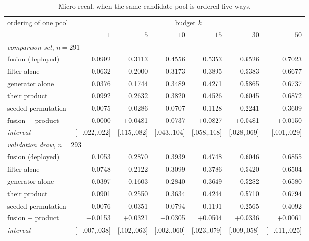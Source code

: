 \begin{table}[h]
\centering\small
\begin{threeparttable}
\caption{Micro recall when the same candidate pool is ordered five ways.}
\label{tab:si-ranking}
\begin{tabular}{lrrrrrr}
\toprule
ordering of one pool & \multicolumn{6}{c}{budget $k$} \\
\cmidrule(lr){2-7}
 & $1$ & $5$ & $10$ & $15$ & $30$ & $50$ \\
\midrule
\multicolumn{7}{l}{\emph{comparison set}, $n = 291$} \\
fusion (deployed) & 0.0992 & 0.3113 & 0.4556 & 0.5353 & 0.6526 & 0.7023 \\
filter alone & 0.0632 & 0.2000 & 0.3173 & 0.3895 & 0.5383 & 0.6677 \\
generator alone & 0.0376 & 0.1744 & 0.3489 & 0.4271 & 0.5865 & 0.6737 \\
their product & 0.0992 & 0.2632 & 0.3820 & 0.4526 & 0.6045 & 0.6872 \\
seeded permutation & 0.0075 & 0.0286 & 0.0707 & 0.1128 & 0.2241 & 0.3609 \\
\quad fusion $-$ product & +0.0000 & +0.0481 & +0.0737 & +0.0827 & +0.0481 & +0.0150 \\
\quad \emph{interval} & {\scriptsize [$-$.022,.022]} & {\scriptsize [.015,.082]} & {\scriptsize [.043,.104]} & {\scriptsize [.058,.108]} & {\scriptsize [.028,.069]} & {\scriptsize [.001,.029]} \\
\midrule
\multicolumn{7}{l}{\emph{validation draw}, $n = 293$} \\
fusion (deployed) & 0.1053 & 0.2870 & 0.3939 & 0.4748 & 0.6046 & 0.6855 \\
filter alone & 0.0748 & 0.2122 & 0.3099 & 0.3786 & 0.5420 & 0.6504 \\
generator alone & 0.0397 & 0.1603 & 0.2840 & 0.3649 & 0.5282 & 0.6580 \\
their product & 0.0901 & 0.2550 & 0.3634 & 0.4244 & 0.5710 & 0.6794 \\
seeded permutation & 0.0076 & 0.0351 & 0.0794 & 0.1191 & 0.2565 & 0.4092 \\
\quad fusion $-$ product & +0.0153 & +0.0321 & +0.0305 & +0.0504 & +0.0336 & +0.0061 \\
\quad \emph{interval} & {\scriptsize [$-$.007,.038]} & {\scriptsize [.002,.063]} & {\scriptsize [.002,.060]} & {\scriptsize [.023,.079]} & {\scriptsize [.009,.058]} & {\scriptsize [$-$.011,.025]} \\
\bottomrule
\end{tabular}

\end{threeparttable}
\end{table}
